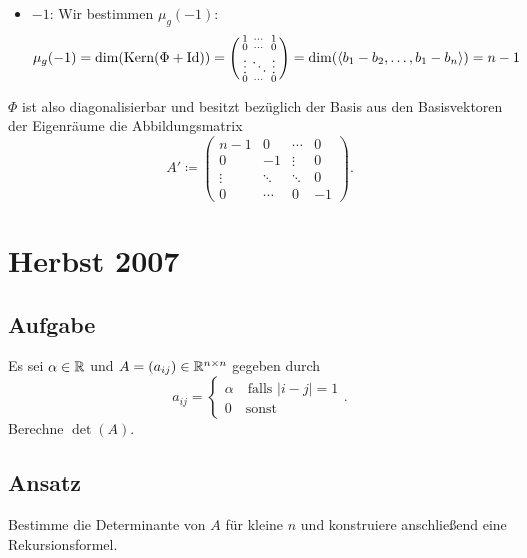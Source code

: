 \begin{enumerate}
\begin{itemize}
	 	\item \( -1 \): Wir bestimmen \( \mu_g(-1) \):
	 	\begin{equation*}
	 	 	\mu_g(-1) = \dim(\text{Kern}(\Phi + \text{Id})) = \left( \begin{smallmatrix}
	 	 		1 & \cdots & 1 \\
	 	 		0 & \cdots & 0 \\
	 	 		\vdots & \ddots & \vdots \\
	 	 		0 & \cdots & 0
	 	 	\end{smallmatrix} \right) = \dim(\langle b_1 - b_2, \dots, b_1 - b_n \rangle) = n-1
	 	 \end{equation*} 
	 \end{itemize}
	 \( \Phi \) ist also diagonalisierbar und besitzt bezüglich der Basis aus den Basisvektoren der Eigenräume die Abbildungsmatrix
	 \begin{equation*}
	 	A' \coloneqq \begin{pmatrix}
	 		n-1 & 0 & \cdots & 0 \\
	 		0 & -1 & \vdots & 0 \\
	 		\vdots & \ddots & \ddots & 0 \\
	 		0 & \cdots & 0 & -1
	 	\end{pmatrix}\text{.}
	 \end{equation*}
\end{enumerate}

\newpage


\section{Herbst 2007}

\subsection{Aufgabe}
Es sei \( \alpha \in \mathbb{R} \) und \( A = (a_{ij}) \in \mathbb{R}^{n \times n} \) gegeben durch
\begin{equation*}
	a_{ij} = \begin{cases}
		\alpha \quad \text{falls } |i-j| = 1 \\
		0 \quad \text{sonst}
	\end{cases}\text{.}
\end{equation*}
Berechne \( \det(A) \).

\subsection{Ansatz}
Bestimme die Determinante von \( A \) für kleine \( n \) und konstruiere anschließend eine Rekursionsformel.

